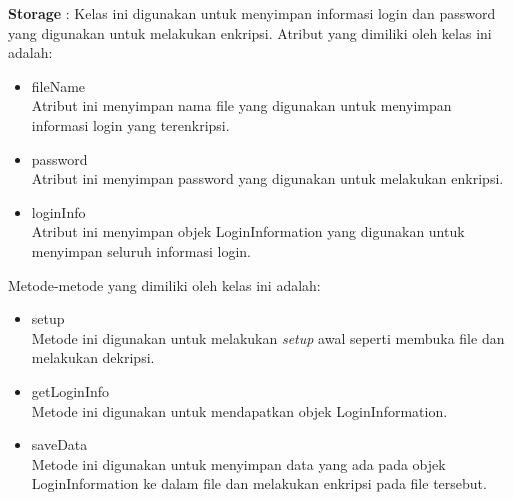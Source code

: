 \documentclass[a4paper,twoside]{article}
\begin{document}
\begin{enumerate}
\begin{itemize}
{                \textbf{Storage} : Kelas ini digunakan untuk menyimpan informasi login dan password yang digunakan untuk melakukan enkripsi. Atribut yang dimiliki oleh kelas ini adalah:
                \begin{itemize}
                    \item{fileName\\Atribut ini menyimpan nama file yang digunakan untuk menyimpan informasi login yang terenkripsi.}
                    \item{password\\Atribut ini menyimpan password yang digunakan untuk melakukan enkripsi.}
                    \item{loginInfo\\Atribut ini menyimpan objek LoginInformation yang digunakan untuk menyimpan seluruh informasi login.}
                \end{itemize}
                Metode-metode yang dimiliki oleh kelas ini adalah:
                \begin{itemize}
                    \item{setup\\Metode ini digunakan untuk melakukan \textit{setup} awal seperti membuka file dan melakukan dekripsi.}
                    \item{getLoginInfo\\Metode ini digunakan untuk mendapatkan objek LoginInformation.}
                    \item{saveData\\Metode ini digunakan untuk menyimpan data yang ada pada objek LoginInformation ke dalam file dan melakukan enkripsi pada file tersebut.}
                \end{itemize}
                
}
\end{itemize}
\end{enumerate}
\end{document}
